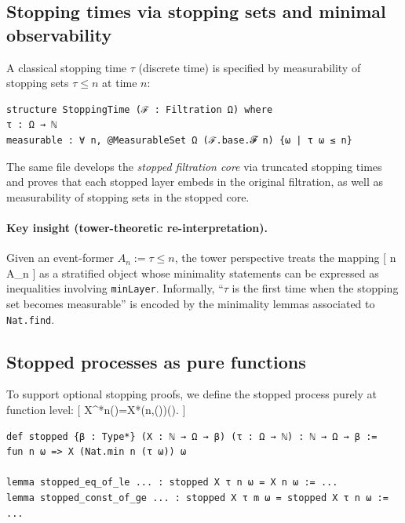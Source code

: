 \documentclass[11pt]{article}
\begin{document}
\subsection{Stopping times via stopping sets and minimal observability}

A classical stopping time $\tau$ (discrete time) is specified by measurability of stopping sets ${\tau \le n}$ at time $n$:

\begin{lstlisting}[language={},caption={Lean: classical stopping time}]
structure StoppingTime (ℱ : Filtration Ω) where
τ : Ω → ℕ
measurable : ∀ n, @MeasurableSet Ω (ℱ.base.𝓕 n) {ω | τ ω ≤ n}
\end{lstlisting}

The same file develops the \emph{stopped filtration core} via truncated stopping times and proves that each stopped layer embeds in the original filtration, as well as measurability of stopping sets in the stopped core. %

\paragraph{Key insight (tower-theoretic re-interpretation).}
Given an event-former $A_n := {\tau \le n}$, the tower perspective treats the mapping
[
n \longmapsto A_n
]
as a stratified object whose minimality statements can be expressed as inequalities involving \texttt{minLayer}. Informally, ``$\tau$ is the first time when the stopping set becomes measurable'' is encoded by the minimality lemmas associated to \texttt{Nat.find}. %

\subsection{Stopped processes as pure functions}

To support optional stopping proofs, we define the stopped process purely at function level:
[
X^{\tau}*n(\omega)=X*{\min(n,\tau(\omega))}(\omega).
]

\begin{lstlisting}[language={},caption={Lean: stopped process and basic laws}]
def stopped {β : Type*} (X : ℕ → Ω → β) (τ : Ω → ℕ) : ℕ → Ω → β :=
fun n ω => X (Nat.min n (τ ω)) ω

lemma stopped_eq_of_le ... : stopped X τ n ω = X n ω := ...
lemma stopped_const_of_ge ... : stopped X τ m ω = stopped X τ n ω := ...
\end{lstlisting}
\end{document}
